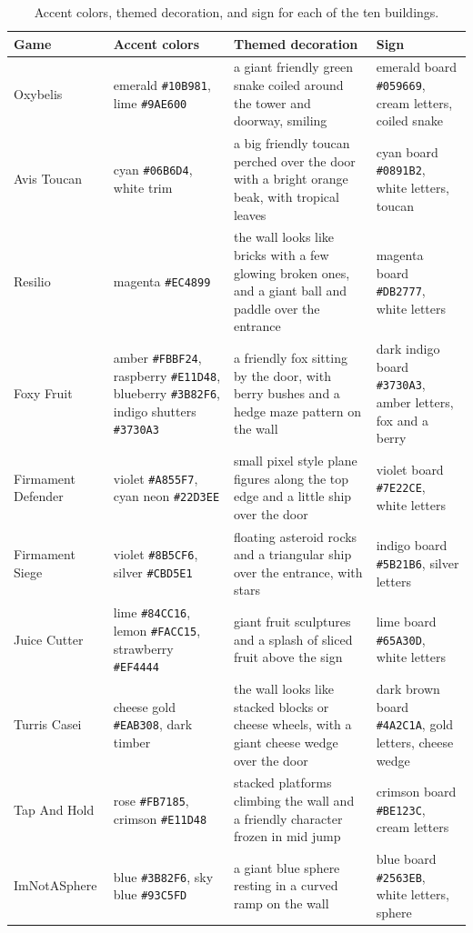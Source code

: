 \documentclass[12pt,letterpaper]{article}
\begin{document}
\begin{table}[H]
\centering
\footnotesize
\begin{tabular}{|p{2.3cm}|p{3.3cm}|p{5.1cm}|p{3.4cm}|}
\hline
\textbf{Game} & \textbf{Accent colors} & \textbf{Themed decoration} & \textbf{Sign} \\
\hline
Oxybelis & emerald \texttt{\#10B981}, lime \texttt{\#9AE600} & a giant friendly green snake coiled around the tower and doorway, smiling & emerald board \texttt{\#059669}, cream letters, coiled snake \\
\hline
Avis Toucan & cyan \texttt{\#06B6D4}, white trim & a big friendly toucan perched over the door with a bright orange beak, with tropical leaves & cyan board \texttt{\#0891B2}, white letters, toucan \\
\hline
Resilio & magenta \texttt{\#EC4899} & the wall looks like bricks with a few glowing broken ones, and a giant ball and paddle over the entrance & magenta board \texttt{\#DB2777}, white letters \\
\hline
Foxy Fruit & amber \texttt{\#FBBF24}, raspberry \texttt{\#E11D48}, blueberry \texttt{\#3B82F6}, indigo shutters \texttt{\#3730A3} & a friendly fox sitting by the door, with berry bushes and a hedge maze pattern on the wall & dark indigo board \texttt{\#3730A3}, amber letters, fox and a berry \\
\hline
Firmament Defender & violet \texttt{\#A855F7}, cyan neon \texttt{\#22D3EE} & small pixel style plane figures along the top edge and a little ship over the door & violet board \texttt{\#7E22CE}, white letters \\
\hline
Firmament Siege & violet \texttt{\#8B5CF6}, silver \texttt{\#CBD5E1} & floating asteroid rocks and a triangular ship over the entrance, with stars & indigo board \texttt{\#5B21B6}, silver letters \\
\hline
Juice Cutter & lime \texttt{\#84CC16}, lemon \texttt{\#FACC15}, strawberry \texttt{\#EF4444} & giant fruit sculptures and a splash of sliced fruit above the sign & lime board \texttt{\#65A30D}, white letters \\
\hline
Turris Casei & cheese gold \texttt{\#EAB308}, dark timber & the wall looks like stacked blocks or cheese wheels, with a giant cheese wedge over the door & dark brown board \texttt{\#4A2C1A}, gold letters, cheese wedge \\
\hline
Tap And Hold & rose \texttt{\#FB7185}, crimson \texttt{\#E11D48} & stacked platforms climbing the wall and a friendly character frozen in mid jump & crimson board \texttt{\#BE123C}, cream letters \\
\hline
ImNotASphere & blue \texttt{\#3B82F6}, sky blue \texttt{\#93C5FD} & a giant blue sphere resting in a curved ramp on the wall & blue board \texttt{\#2563EB}, white letters, sphere \\
\hline
\end{tabular}
\caption{Accent colors, themed decoration, and sign for each of the ten buildings.}
\end{table}
\end{document}

